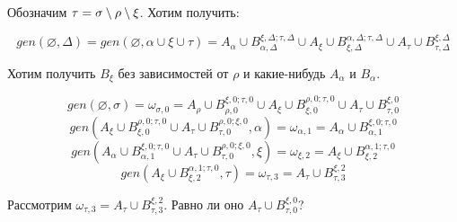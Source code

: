 Обозначим $\tau = {\sigma\setminus\rho\setminus\xi}$. Хотим получить:

$$gen(\varnothing, \Delta) = gen(\varnothing, \alpha \cup \xi \cup \tau) = A_\alpha \cup B^{\xi,\Delta;\tau,\Delta}_{\alpha,\Delta} \cup A_\xi \cup B^{\alpha,\Delta;\tau,\Delta}_{\xi,\Delta} \cup A_\tau \cup B^{\xi,\Delta}_{\tau,\Delta}$$

Хотим получить $B_\xi$ без зависимостей от $\rho$ и какие-нибудь $A_\alpha$ и $B_\alpha$.

$$gen(\varnothing, \sigma) = \omega_{\sigma,0} = A_\rho \cup B^{\xi,0;\tau,0}_{\rho,0} \cup A_\xi \cup B^{\rho,0;\tau,0}_{\xi,0} \cup A_\tau \cup B^{\xi,0}_{\tau,0}$$
$$gen(A_\xi \cup B^{\rho,0;\tau,0}_{\xi,0} \cup A_\tau \cup B^{\rho,0;\xi,0}_{\tau,0}, \alpha) = \omega_{\alpha,1} = A_\alpha \cup B^{\xi,0;\tau,0}_{\alpha,1}$$
$$gen(A_\alpha \cup B^{\xi,0;\tau,0}_{\alpha,1} \cup A_\tau \cup B^{\rho,0;\xi,0}_{\tau,0}, \xi) = \omega_{\xi,2} = A_\xi \cup B^{\alpha,1;\tau,0}_{\xi,2}$$
$$gen(A_\xi \cup B^{\alpha,1;\tau,0}_{\xi,2}, \tau) = \omega_{\tau,3} = A_\tau \cup B^{\xi,2}_{\tau,3}$$

Рассмотрим $\omega_{\tau,3} = A_\tau \cup B^{\xi,2}_{\tau,3}$. Равно ли оно $A_\tau \cup B^{\xi,0}_{\tau,0}$?

